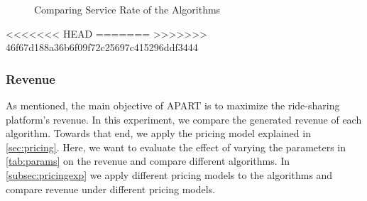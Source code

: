 \begin{figure}[h]
    \centering
    \vspace{-0.15in}
    \caption{Comparing Service Rate of the Algorithms}
    \label{fig:sr}
\end{figure}

<<<<<<< HEAD
\vspace{-5mm}
=======
\vspace{-1mm}
>>>>>>> 46f67d188a36b6f09f72c25697c415296ddf3444
\subsubsection{Revenue}
As mentioned, the main objective of APART is to maximize the ride-sharing platform's revenue. In this experiment, we compare the generated revenue of each algorithm. Towards that end, we apply the pricing model explained in \cref{sec:pricing}. Here, we want to evaluate the effect of varying the parameters in \cref{tab:params} on the revenue and compare different algorithms. In \cref{subsec:pricingexp} we apply different pricing models to the algorithms and compare revenue under different pricing models.

